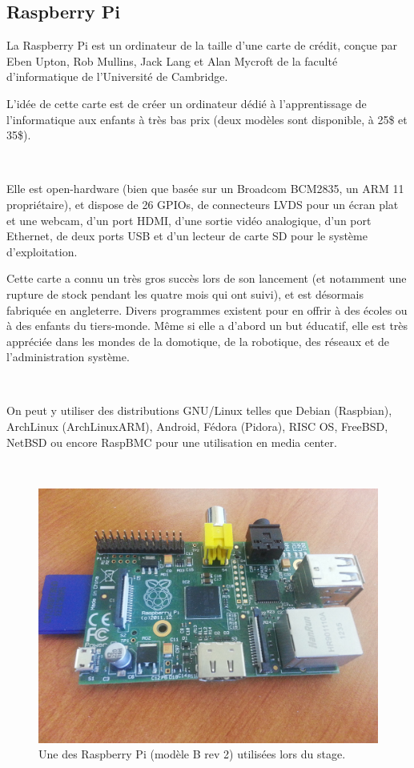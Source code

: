\documentclass{article}
\begin{document}
\clearpage

\subsection{Raspberry Pi}
\label{rpi}

La Raspberry Pi est un ordinateur de la taille d’une carte de crédit, conçue par Eben Upton, Rob Mullins, Jack Lang et Alan Mycroft de la faculté d’informatique de l’Université de Cambridge.

L’idée de cette carte est de créer un ordinateur dédié à l’apprentissage de l’informatique aux enfants à très bas prix (deux modèles sont disponible, à 25\$ et 35\$).

~

Elle est open-hardware (bien que basée sur un Broadcom BCM2835, un ARM 11 propriétaire), et dispose de 26 GPIOs, de connecteurs LVDS pour un écran plat et une webcam, d’un port HDMI, d’une sortie vidéo analogique, d’un port Ethernet, de deux ports USB et d’un lecteur de carte SD pour le système d’exploitation.

Cette carte a connu un très gros succès lors de son lancement (et notamment une rupture de stock pendant les quatre mois qui ont suivi), et est désormais fabriquée en angleterre. Divers programmes existent pour en offrir à des écoles ou à des enfants du tiers-monde. Même si elle a d’abord un but éducatif, elle est très appréciée dans les mondes de la domotique, de la robotique, des réseaux et de l’administration système.

~

On peut y utiliser des distributions GNU/Linux telles que Debian (Raspbian), ArchLinux (ArchLinuxARM), Android, Fédora (Pidora), RISC OS, FreeBSD, NetBSD ou encore RaspBMC pour une utilisation en media center.

~

\begin{figure}[h!]
    \centering\includegraphics[width=\linewidth*2/3]{img/rpi.jpg}
    \caption{Une des Raspberry Pi (modèle B rev 2) utilisées lors du stage.}
\end{figure}
\end{document}

